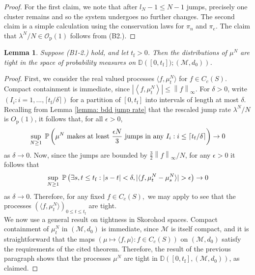 \documentclass[11pt, notitlepage]{article}
\newcommand{\abs}[1]{\left\lvert{#1}\right\rvert}
\newcommand{\supnorm}[1]{\left\lVert{#1}\right\rVert_\infty}
\newtheorem{lem}[thm]{Lemma}
\begin{document}
\begin{proof}
For the first claim, we note that after $l_N-1 \le N-1$ jumps, precisely one cluster remains and so the system undergoes no further changes.  The second claim is a simple calculation using the conservation laws for $\pi_n$ and $\pi_e$. The claim that $\lambda^N/N \in \mathcal{O}_\mathrm{p}(1)$ follows from (B2.).
\end{proof}

\begin{lem}\label{lemma: tight processes}
Suppose (B1-2.) hold, and let $t_\mathrm{f}>0$. Then
 the distributions of $\mu^N$ are tight in the space of probability measures on $\mathbb{D}\left([0,t_\mathrm{f}]);  \left(\mathcal{M}, d_0\right)\right)$.
\end{lem}
\begin{proof}
First, we consider the real valued processes $\langle f, \mu^N_t\rangle$ for $f\in C_c(S).$ Compact containment is immediate, since $\abs{\left<f,\mu_t^N\right>} \leq \supnorm{f}$. For $\delta>0$, write $(I_i: i=1,...,\lceil t_\mathrm{f}/\delta\rceil)$ for a partition of $[0,t_\mathrm{f}]$ into intervals of length at most $\delta$. Recalling from Lemma \ref{lemma: bdd jump rate} that the rescaled jump rate $\lambda^N/N$ is $O_\mathrm{p}(1)$, it follows that, for all $\epsilon>0$, \begin{equation} \sup_{N\ge 1}\hspace{0.1cm} \mathbb{P}\left(\mu^N \text{ makes at least }\frac{\epsilon N}{3} \text{ jumps in any  } I_i: i\le \lceil t_\mathrm{f}/\delta\rceil\right) \rightarrow 0 \end{equation} as $\delta\rightarrow 0.$ Now, since the jumps are bounded by $\frac{3}{2}\supnorm{f}/N$, for any $\epsilon>0$ it follows that \begin{equation} \sup_{N\ge 1} \hspace{0.1cm} \mathbb{P}\left(\exists s, t \le t_\mathrm{f}: |s-t|<\delta, |\langle f, \mu^N_t-\mu^N_s\rangle|>\epsilon\right) \rightarrow 0 \end{equation} as $\delta \rightarrow 0.$ Therefore, for any fixed $f \in C_c(S),$ we may apply \cite[Chapter 3, Theorem 8.6c)]{EK86} to see that the processes $(\langle f, \mu^N_t\rangle)_{0\le t\le t_\mathrm{f}}$ are tight. \medskip \\ 
We now use a general result \cite[Theorem 4.6]{J86} on tightness in Skorohod spaces. Compact containment of $\mu^N_t$ in $(\mathcal{M}, d_0)$ is immediate, since $\mathcal{M}$ is itself compact, and it is straightforward that the maps $(\mu \mapsto \langle f, \mu\rangle: f\in C_c(S))$ on $(\mathcal{M},d_0)$ satisfy the requirements of the cited theorem. Therefore, the result of the previous paragraph shows that the processes $\mu^N$ are tight in $\mathbb{D}([0,t_\mathrm{f}],(\mathcal{M},d_0))$, as claimed.
\end{proof}
\end{document}
